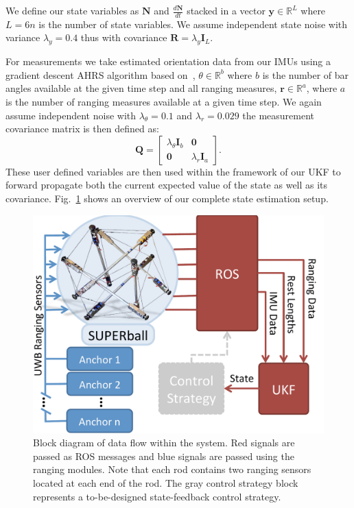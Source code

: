 {We define our state variables as $\boldsymbol{N}$ and $\frac{d\boldsymbol{N}}{dt}$ stacked in a vector $\boldsymbol{y}\in\mathbb{R}^{L}$ where $L = 6n$ is the number of state variables. 
We assume independent state noise with variance $\lambda_y = 0.4$ thus with covariance $\boldsymbol{R} = \lambda_y\bm{I}_L$.

For measurements we take estimated orientation data from our IMUs using a gradient descent AHRS algorithm based on~\cite{madgwick2011estimation}, $\theta\in\mathbb{R}^{b}$ where $b$ is the number of bar angles available at the given time step and all ranging measures, $\boldsymbol{r}\in\mathbb{R}^{a}$, where $a$ is the number of ranging measures available at a given time step.
We again assume independent noise with $\lambda_\theta = 0.1$ and $\lambda_r = 0.029$ the measurement covariance matrix is then defined as:
$$
\boldsymbol{Q} =  \left[ \begin{array}{ccc} \lambda_\theta\bm{I}_b & \boldsymbol{0} \\
                         \boldsymbol{0}        & \lambda_r\bm{I}_a  \end{array} \right].
$$
These user defined variables are then used within the framework of our UKF to forward propagate both the current expected value of the state as well as its covariance. 
Fig.~\ref{fig:UKFflowChart} shows an overview of our complete state estimation setup. 



\begin{figure}[tpbh]
 \centering
  \includegraphics[width=0.85\linewidth]{tex/img/flow_chartSB.pdf}
 \caption{Block diagram of data flow within the system. Red signals are passed as ROS messages and blue signals are passed using the ranging modules. Note that each rod contains two ranging sensors located at each end of the rod. The gray control strategy block represents a to-be-designed state-feedback control strategy.}
\label{fig:UKFflowChart}
 \end{figure}

}
